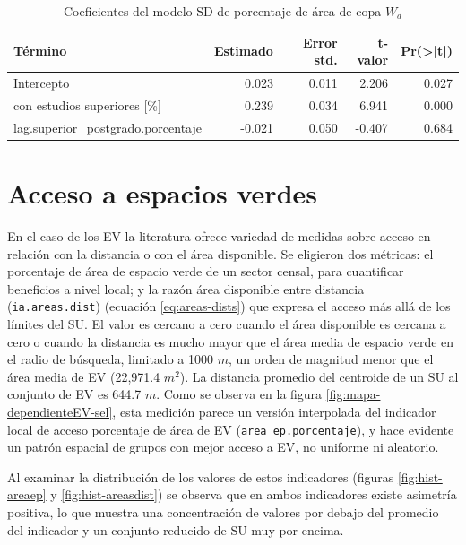\documentclass[12pt,a4paper,openany]{book}
\theoremstyle{definition}
\theoremstyle{definition}
\theoremstyle{definition}
\theoremstyle{remark}
\begin{document}
\begin{table}[H]

\caption{\label{tab:coef-sd-copaap}Coeficientes del modelo SD de porcentaje de área de copa $W_d$}
\centering
\begin{tabular}{lrrrr}
\toprule
Término & Estimado & Error std. & t-valor & Pr(>|t|)\\
\midrule
Intercepto & 0.023 & 0.011 & 2.206 & 0.027\\
con estudios superiores [\%] & 0.239 & 0.034 & 6.941 & 0.000\\
lag.superior\_postgrado.porcentaje & -0.021 & 0.050 & -0.407 & 0.684\\
\bottomrule
\end{tabular}
\end{table}

\section{Acceso a espacios verdes}\label{acceso-a-espacios-verdes-1}

En el caso de los EV la literatura ofrece variedad de medidas sobre
acceso en relación con la distancia o con el área disponible. Se
eligieron dos métricas: el porcentaje de área de espacio verde de un
sector censal, para cuantificar beneficios a nivel local; y la razón
área disponible entre distancia (\texttt{ia.areas.dist}) (ecuación
\eqref{eq:areas-dists}) que expresa el acceso más allá de los límites del
SU. El valor es cercano a cero cuando el área disponible es cercana a
cero o cuando la distancia es mucho mayor que el área media de espacio
verde en el radio de búsqueda, limitado a 1000 \(m\), un orden de
magnitud menor que el área media de EV (22,971.4 \(m^2\)). La distancia
promedio del centroide de un SU al conjunto de EV es 644.7 \(m\). Como
se observa en la figura \ref{fig:mapa-dependienteEV-sel}, esta medición
parece un versión interpolada del indicador local de acceso porcentaje
de área de EV (\texttt{area\_ep.porcentaje}), y hace evidente un patrón
espacial de grupos con mejor acceso a EV, no uniforme ni aleatorio.

Al examinar la distribución de los valores de estos indicadores (figuras
\ref{fig:hist-areaep} y \ref{fig:hist-areasdist}) se observa que en
ambos indicadores existe asimetría positiva, lo que muestra una
concentración de valores por debajo del promedio del indicador y un
conjunto reducido de SU muy por encima.
\end{document}
